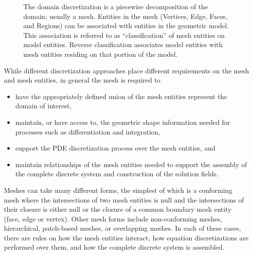 \begin{figure}
\begin{center}
\caption{The domain discretization is a piecewise decomposition of the domain; usually a mesh.  Entities in the mesh (Vertices, Edge, Faces, and Regions) can
be associated with entities in the geometric model.  This association is referred to as ``classification'' of mesh entities on model entities.  Reverse classification associates model entities with mesh entities residing on that portion of the model.}
\label{fig:domainDisc}
\end{center}
\end{figure}

While different discretization approaches place different requirements
on the mesh and mesh entities, in general the mesh is required to
\begin{itemize}
\item have the appropriately defined union of the mesh
entities represent the domain of interest,
\item maintain, or have access to, the geometric shape information
needed for processes such as differentiation and integration,
\item support the PDE discretization process over the mesh entities, and
\item maintain relationships of the mesh entities needed to support
the assembly of the complete discrete system and construction of the
solution fields.
\end{itemize}

Meshes can take many different forms, the simplest of which is
a conforming mesh where the intersections of
two mesh entities is null and the intersections of their closure is
either null or the closure of a common boundary mesh entity (face,
edge or vertex). Other mesh forms include non-conforming meshes,
hierarchical, patch-based meshes, or overlapping meshes.
In each of these cases, there are
rules on how the mesh entities interact, how equation discretizations
are performed over them, and how the complete discrete system is
assembled.


